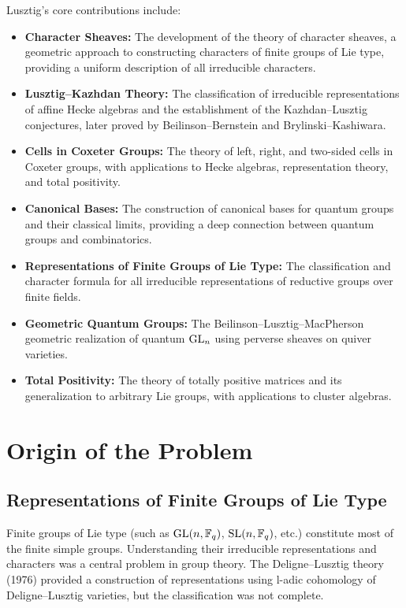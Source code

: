 Lusztig's core contributions include:
\begin{itemize}
    \item \textbf{Character Sheaves:} The development of the theory of character sheaves, a geometric approach to constructing characters of finite groups of Lie type, providing a uniform description of all irreducible characters.
    \item \textbf{Lusztig--Kazhdan Theory:} The classification of irreducible representations of affine Hecke algebras and the establishment of the Kazhdan--Lusztig conjectures, later proved by Beilinson--Bernstein and Brylinski--Kashiwara.
    \item \textbf{Cells in Coxeter Groups:} The theory of left, right, and two-sided cells in Coxeter groups, with applications to Hecke algebras, representation theory, and total positivity.
    \item \textbf{Canonical Bases:} The construction of canonical bases for quantum groups and their classical limits, providing a deep connection between quantum groups and combinatorics.
    \item \textbf{Representations of Finite Groups of Lie Type:} The classification and character formula for all irreducible representations of reductive groups over finite fields.
    \item \textbf{Geometric Quantum Groups:} The Beilinson--Lusztig--MacPherson geometric realization of quantum $\operatorname{GL}_n$ using perverse sheaves on quiver varieties.
    \item \textbf{Total Positivity:} The theory of totally positive matrices and its generalization to arbitrary Lie groups, with applications to cluster algebras.
\end{itemize}

\section{Origin of the Problem}

\subsection{Representations of Finite Groups of Lie Type}

Finite groups of Lie type (such as $\operatorname{GL}(n, \mathbb{F}_q)$, $\operatorname{SL}(n, \mathbb{F}_q)$, etc.) constitute most of the finite simple groups. Understanding their irreducible representations and characters was a central problem in group theory. The Deligne--Lusztig theory (1976) provided a construction of representations using l-adic cohomology of Deligne--Lusztig varieties, but the classification was not complete.

